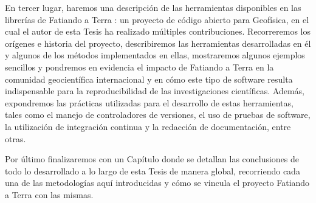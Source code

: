 En tercer lugar, haremos una descripción de las herramientas disponibles en las
librerías de Fatiando a Terra \citep{uieda2013}: un proyecto de código abierto
para Geofísica, en el cual el autor de esta Tesis ha realizado múltiples
contribuciones.
Recorreremos los orígenes e historia del proyecto, describiremos las
herramientas desarrolladas en él y algunos de los métodos implementados en
ellas, mostraremos algunos ejemplos sencillos y pondremos en evidencia el
impacto de Fatiando a Terra en la comunidad geocientífica internacional y en
cómo este tipo de software resulta indispensable para la reproducibilidad de
las investigaciones científicas.
Además, expondremos las prácticas utilizadas para el desarrollo de estas
herramientas, tales como el manejo de controladores de versiones, el uso de
pruebas de software, la utilización de integración continua y la redacción de
documentación, entre otras.

Por último finalizaremos con un Capítulo donde se detallan las
conclusiones de todo lo desarrollado a lo largo de esta Tesis de manera global,
recorriendo cada una de las metodologías aquí introducidas y cómo se
vincula el proyecto Fatiando a Terra con las mismas.
